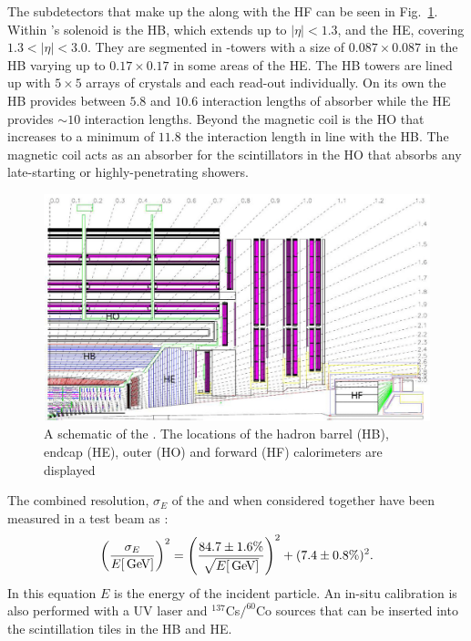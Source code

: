 The subdetectors that make up the \HCAL along with the \ac{HF} can be
seen in Fig.~\ref{fig:hcal}. Within \CMS's solenoid is the \ac{HB},
which extends up to $|\eta|<1.3$, and the \ac{HE}, covering
$1.3<|\eta|<3.0$. They are segmented in \eta-\phi towers with a size
of $0.087\times0.087$ in the \ac{HB} varying up to $0.17\times0.17$ in
some areas of the \ac{HE}. The \ac{HB} towers are lined up with
$5\times5$ arrays of \ECAL crystals and each read-out individually. On
its own the \ac{HB} provides between $5.8$ and $10.6$ interaction
lengths of absorber while the \ac{HE} provides $\sim10$ interaction
lengths. Beyond the magnetic coil is the \ac{HO} that increases to a
minimum of $11.8$ the interaction length in line with the \ac{HB}. The
magnetic coil acts as an absorber for the scintillators in the \ac{HO}
that absorbs any late-starting or highly-penetrating showers.

\begin{figure}
\begin{center}
\includegraphics[width=0.8\linewidth]{figs/cms_HCAL} \end{center}
\caption{ A schematic of the \CMS \HCAL. The locations of the hadron
barrel (HB), endcap (HE), outer (HO) and forward (HF) calorimeters are
displayed \cite{Chatrchyan:2008aa}}
\label{fig:hcal} \end{figure}

The combined resolution, $\sigma_E$ of the \ECAL and \HCAL when
considered together have been measured in a test beam as
\cite{Abdullin:2008zzb}: 
\begin{equation} \label{eq:hcalres}
\left(\frac{\sigma_E}{E[\mathrm{\,Ge\kern -0.1em V}]}\right)^2=\left(\frac{84.7\pm1.6\%}
{\sqrt{E[\mathrm{\,Ge\kern -0.1em V}]}}\right)^2+(7.4\pm0.8\%)^2.  
\end{equation} 
In this equation $E$ is the energy of the incident particle. An
in-situ calibration is also performed with a UV laser and
$^{137}$Cs$/^{60}$Co sources that can be inserted into the scintillation
tiles in the \ac{HB} and \ac{HE}.

